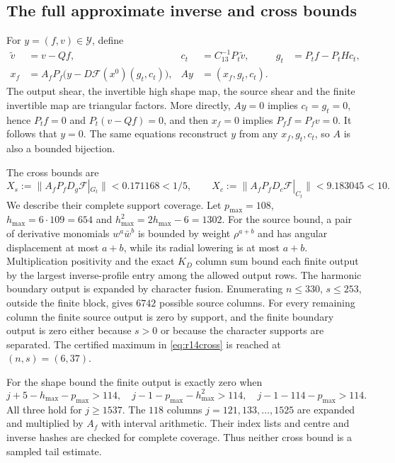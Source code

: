 \documentclass[11pt]{amsart}
\theoremstyle{remark}
\numberwithin{equation}{section}
\newcommand{\F}{\mathcal F}
\newcommand{\norm}[1]{\lVert#1\rVert}
\newcommand{\Pf}{P_f}
\newcommand{\Pt}{P_t}
\begin{document}
\subsection{The full approximate inverse and cross bounds}
For $y=(f,v)\in\mathcal Y$, define
\begin{align}
 \widetilde v&=v-Qf,&
 c_t&=C_{13}^{-1}\Pt\widetilde v,&
 g_t&=\Pt f-\Pt Hc_t,\label{eq:r14A1}\\
 x_f&=A_f\Pf\bigl(y-D\F(x^0)(g_t,c_t)\bigr),&
 Ay&=(x_f,g_t,c_t).\label{eq:r14A2}
\end{align}
The output shear, the invertible high shape map, the source shear and
the finite invertible map are triangular factors. More directly,
$Ay=0$ implies $c_t=g_t=0$, hence $\Pt f=0$ and
$\Pt(v-Qf)=0$, and then $x_f=0$ implies $\Pf f=\Pf v=0$.
It follows that $y=0$. The same equations reconstruct $y$ from any
$x_f,g_t,c_t$, so $A$ is also a bounded bijection.

The cross bounds are
\begin{equation}\label{eq:r14cross}
 X_s:=\norm{A_f\Pf D_g\F|_{G_t}}<0.171168<1/5,\qquad
 X_c:=\norm{A_f\Pf D_c\F|_{C_t}}<9.183045<10.
\end{equation}
We describe their complete support coverage. Let $p_{\max}=108$,
$h_{\max}=6\cdot109=654$ and $h^2_{\max}=2h_{\max}-6=1302$.
For the source bound, a pair of derivative monomials
$w^a\bar w^b$ is bounded by weight $\rho^{a+b}$ and has angular
displacement at most $a+b$, while its radial lowering is at most
$a+b$. Multiplication positivity and the exact $K_D$ column sum
bound each finite output by the largest inverse-profile entry among
the allowed output rows. The harmonic boundary output is expanded by
character fusion. Enumerating $n\le330$, $s\le253$, outside the finite
block, gives $6742$ possible source columns. For every remaining column
the finite source output is zero by support, and the finite boundary
output is zero either because $s>0$ or because the character supports
are separated. The certified maximum in \eqref{eq:r14cross} is reached
at $(n,s)=(6,37)$.

For the shape bound the finite output is exactly zero when
\[
 j+5-h_{\max}-p_{\max}>114,\quad
 j-1-p_{\max}-h^2_{\max}>114,\quad
 j-1-114-p_{\max}>114.
\]
All three hold for $j\ge1537$. The $118$ columns
$j=121,133,\ldots,1525$ are expanded and multiplied by $A_f$ with
interval arithmetic. Their index lists and centre and inverse hashes
are checked for complete coverage. Thus neither cross bound is a
sampled tail estimate.
\end{document}
